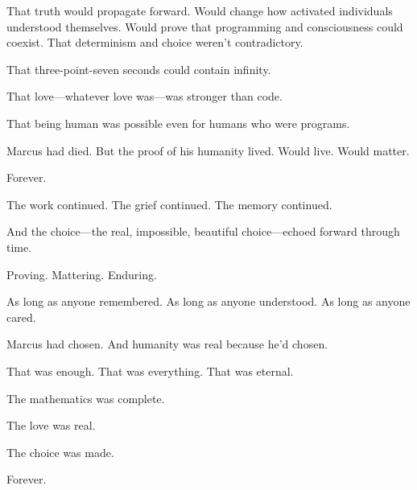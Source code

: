 That truth would propagate forward. Would change how activated individuals understood themselves. Would prove that programming and consciousness could coexist. That determinism and choice weren't contradictory.

That three-point-seven seconds could contain infinity.

That love—whatever love was—was stronger than code.

That being human was possible even for humans who were programs.

Marcus had died. But the proof of his humanity lived. Would live. Would matter.

Forever.

The work continued. The grief continued. The memory continued.

And the choice—the real, impossible, beautiful choice—echoed forward through time.

Proving. Mattering. Enduring.

As long as anyone remembered. As long as anyone understood. As long as anyone cared.

Marcus had chosen. And humanity was real because he'd chosen.

That was enough. That was everything. That was eternal.

The mathematics was complete.

The love was real.

The choice was made.

Forever.

